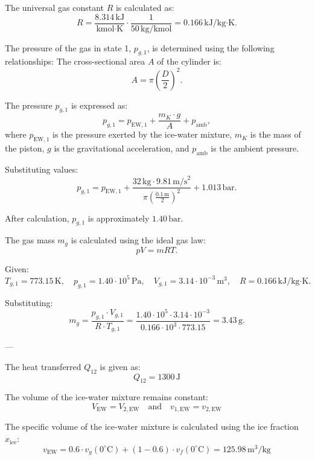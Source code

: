 The universal gas constant \( R \) is calculated as:  
\[
R = \frac{8.314 \, \text{kJ}}{\text{kmol·K}} \cdot \frac{1}{50 \, \text{kg/kmol}} = 0.166 \, \text{kJ/kg·K}.
\]

The pressure of the gas in state 1, \( p_{g,1} \), is determined using the following relationships:  
The cross-sectional area \( A \) of the cylinder is:  
\[
A = \pi \left( \frac{D}{2} \right)^2.
\]

The pressure \( p_{g,1} \) is expressed as:  
\[
p_{g,1} = p_{\text{EW},1} + \frac{m_K \cdot g}{A} + p_{\text{amb}},
\]
where \( p_{\text{EW},1} \) is the pressure exerted by the ice-water mixture, \( m_K \) is the mass of the piston, \( g \) is the gravitational acceleration, and \( p_{\text{amb}} \) is the ambient pressure.

Substituting values:  
\[
p_{g,1} = p_{\text{EW},1} + \frac{32 \, \text{kg} \cdot 9.81 \, \text{m/s}^2}{\pi \left( \frac{0.1 \, \text{m}}{2} \right)^2} + 1.013 \, \text{bar}.
\]

After calculation, \( p_{g,1} \) is approximately \( 1.40 \, \text{bar} \).

The gas mass \( m_g \) is calculated using the ideal gas law:  
\[
pV = mRT.
\]

Given:  
\[
T_{g,1} = 773.15 \, \text{K}, \quad p_{g,1} = 1.40 \cdot 10^5 \, \text{Pa}, \quad V_{g,1} = 3.14 \cdot 10^{-3} \, \text{m}^3, \quad R = 0.166 \, \text{kJ/kg·K}.
\]

Substituting:  
\[
m_g = \frac{p_{g,1} \cdot V_{g,1}}{R \cdot T_{g,1}} = \frac{1.40 \cdot 10^5 \cdot 3.14 \cdot 10^{-3}}{0.166 \cdot 10^3 \cdot 773.15} = 3.43 \, \text{g}.
\]

---

The heat transferred \( Q_{12} \) is given as:  
\[
Q_{12} = 1300 \, \text{J}
\]

The volume of the ice-water mixture remains constant:  
\[
V_{\text{EW}} = V_{2,\text{EW}} \quad \text{and} \quad v_{1,\text{EW}} = v_{2,\text{EW}}
\]

The specific volume of the ice-water mixture is calculated using the ice fraction \( x_{\text{ice}} \):  
\[
v_{\text{EW}} = 0.6 \cdot v_g(0^\circ\text{C}) + (1 - 0.6) \cdot v_f(0^\circ\text{C}) = 125.98 \, \text{m}^3/\text{kg}
\]